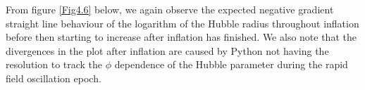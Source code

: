 \documentclass[a4paper,12pt,twoside]{report}
\begin{document}
\noindent%
\begin{minipage}{\linewidth}%
\label{Fig4.5}
\end{minipage}

From figure \ref{Fig4.6} below, we again observe the expected negative gradient straight line behaviour of the logarithm of the Hubble radius throughout inflation before then starting to increase after inflation has finished. We also note that the divergences in the plot after inflation are caused by Python not having the resolution to track the $\phi$ dependence of the Hubble parameter during the rapid field oscillation epoch.
\end{document}
